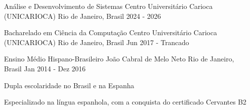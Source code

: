 

\begin{cventries}

  \cventry
    {Análise e Desenvolvimento de Sistemas} %
    {Centro Universitário Carioca (UNICARIOCA)} %
    {Rio de Janeiro, Brasil} %
    {2024 - 2026} %
    {
    }
    
  \cventry
    {Bacharelado em Ciência da Computação} %
    {Centro Universitário Carioca (UNICARIOCA)} %
    {Rio de Janeiro, Brasil} %
    {Jun 2017 - Trancado} %
    {
    }
    
  \cventry
    {Ensino Médio} %
    {Hispano-Brasileiro João Cabral de Melo Neto} %
    {Rio de Janeiro, Brasil} %
    {Jan 2014 - Dez 2016} %
    {
      \begin{cvitems} %
        \item {Dupla escolaridade no Brasil e na Espanha}
        \item {Especializado na língua espanhola, com a conquista do certificado Cervantes B2}
      \end{cvitems}
    }
\end{cventries}
